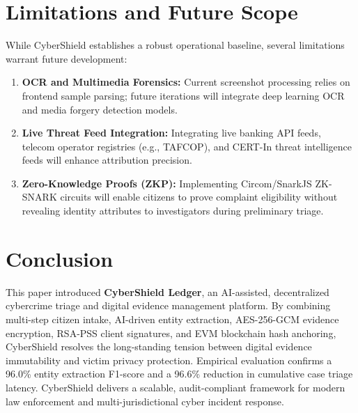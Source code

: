 \documentclass[conference]{IEEEtran}
\begin{document}
\section{Limitations and Future Scope}
While CyberShield establishes a robust operational baseline, several limitations warrant future development:
\begin{enumerate}
    \item \textbf{OCR and Multimedia Forensics:} Current screenshot processing relies on frontend sample parsing; future iterations will integrate deep learning OCR and media forgery detection models.
    \item \textbf{Live Threat Feed Integration:} Integrating live banking API feeds, telecom operator registries (e.g., TAFCOP), and CERT-In threat intelligence feeds will enhance attribution precision.
    \item \textbf{Zero-Knowledge Proofs (ZKP):} Implementing Circom/SnarkJS ZK-SNARK circuits will enable citizens to prove complaint eligibility without revealing identity attributes to investigators during preliminary triage.
\end{enumerate}

\section{Conclusion}
This paper introduced \textbf{CyberShield Ledger}, an AI-assisted, decentralized cybercrime triage and digital evidence management platform. By combining multi-step citizen intake, AI-driven entity extraction, AES-256-GCM evidence encryption, RSA-PSS client signatures, and EVM blockchain hash anchoring, CyberShield resolves the long-standing tension between digital evidence immutability and victim privacy protection. Empirical evaluation confirms a 96.0\% entity extraction F1-score and a 96.6\% reduction in cumulative case triage latency. CyberShield delivers a scalable, audit-compliant framework for modern law enforcement and multi-jurisdictional cyber incident response.
\end{document}
